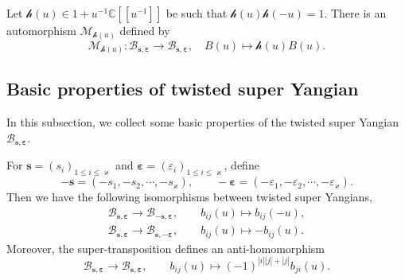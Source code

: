 \documentclass[11pt,reqno]{amsart}
\numberwithin{equation}{section}
\theoremstyle{definition}
\theoremstyle{remark}
\newcommand{\beq}{\begin{equation}}
\newcommand{\eeq}{\end{equation}}
\newcommand{\C}{\mathbb{C}}
\newcommand{\mc}{\mathcal}
\newcommand{\lle}{\leqslant}
\newcommand{\BMN}{{\mathscr{B}_{\bm s,\bm \ve}}}
\newcommand{\ka}{\varkappa}
\newcommand{\ve}{\varepsilon}
\newcommand{\s}{{\bm s}}
\begin{document}
Let $\mc h(u)\in1+u^{-1}\C[[u^{-1}]]$ be such that $\mc h(u)\mc h(-u)=1$. There is an automorphism $\mc M_{\mc h(u)}$ defined by
\beq\label{mhu}
\mc M_{\mc h(u)}:\BMN\to \BMN,\quad B(u)\mapsto \mc h(u)B(u).
\eeq

\subsection{Basic properties of twisted super Yangian}\label{sec:properties}
In this subsection, we collect some basic properties of the twisted super Yangian $\mathscr B_{\bm s,\bm\ve}$.

For $\s=(s_i)_{1\lle i\lle \ka}$ and $\bm\ve=(\ve_i)_{1\lle i\lle \ka}$, define
\[
-\s=(-s_1,-s_2,\cdots,-s_{\ka}),\qquad -\bm\ve=(-\ve_1,-\ve_2,\cdots,-\ve_\ka).
\]
Then we have the following isomorphisms between twisted super Yangians,
\begin{align}
\BMN\to \mathscr B_{-\s,\bm\ve},\qquad b_{ij}(u)\mapsto b_{ij}(-u),\label{neghomo1}\\
\BMN\to \mathscr B_{\s,-\bm\ve},\qquad b_{ij}(u)\mapsto -b_{ij}(u).\label{neghomo2}
\end{align}
Moreover, the super-transposition defines an anti-homomorphism
\[
\BMN\to \BMN,\qquad b_{ij}(u)\mapsto (-1)^{|i||j|+|j|}b_{ji}(u).
\]
\end{document}
